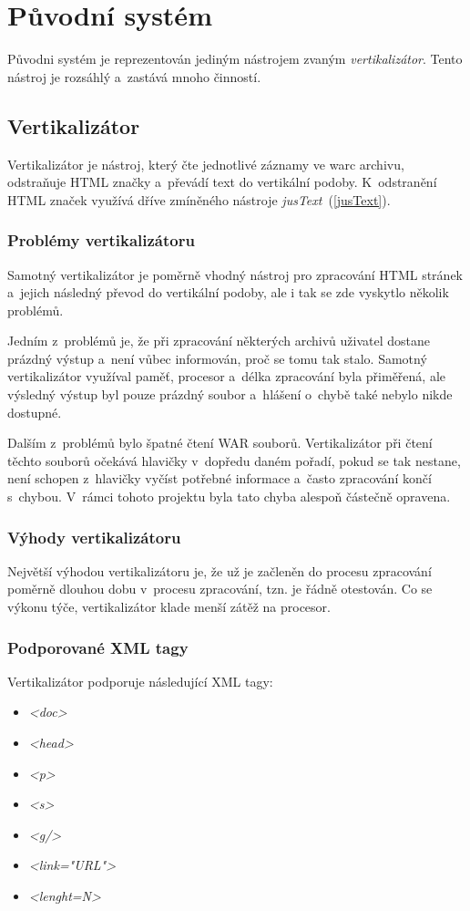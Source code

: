 \section{Původní systém}
Původni systém je reprezentován jediným nástrojem zvaným \textit{vertikalizátor}. Tento nástroj je
rozsáhlý a~zastává mnoho činností.

\subsection{Vertikalizátor}
\label{vertikalizator}
Vertikalizátor je nástroj, který čte jednotlivé záznamy ve warc archivu, odstraňuje
HTML značky a~převádí text do vertikální podoby. K~odstranění HTML značek využívá
dříve zmíněného nástroje \textit{jusText}~(\ref{jusText}).

\subsubsection{Problémy vertikalizátoru}
Samotný vertikalizátor je poměrně vhodný nástroj pro zpracování HTML stránek a~jejich následný převod do vertikální podoby, ale i tak se zde vyskytlo několik problémů.

Jedním z~problémů je, že při zpracování některých archivů uživatel dostane prázdný výstup
a~není vůbec informován, proč se tomu tak stalo. Samotný vertikalizátor využíval paměť,
procesor a~délka zpracování byla přiměřená, ale výsledný výstup byl pouze prázdný
soubor a~hlášení o~chybě také nebylo nikde dostupné.

Dalším z~problémů bylo špatné čtení WAR souborů. Vertikalizátor při čtení těchto souborů
očekává hlavičky v~dopředu daném pořadí, pokud se tak nestane, není schopen z~hlavičky
vyčíst potřebné informace a~často zpracování končí s~chybou. V~rámci tohoto projektu
byla tato chyba alespoň částečně opravena.

\subsubsection{Výhody vertikalizátoru}
Největší výhodou vertikalizátoru je, že už je začleněn do procesu zpracování poměrně
dlouhou dobu v~procesu zpracování, tzn. je řádně otestován. Co se výkonu týče,
vertikalizátor klade menší zátěž na procesor.

\subsubsection{Podporované XML tagy}
Vertikalizátor podporuje následující XML tagy:
\begin{itemize}
    \item \textit{<doc>}
    \item \textit{<head>}
    \item \textit{<p>}
    \item \textit{<s>}
    \item \textit{<g/>}
    \item \textit{<link="URL"\textgreater}
    \item \textit{<lenght=N>}
\end{itemize}

